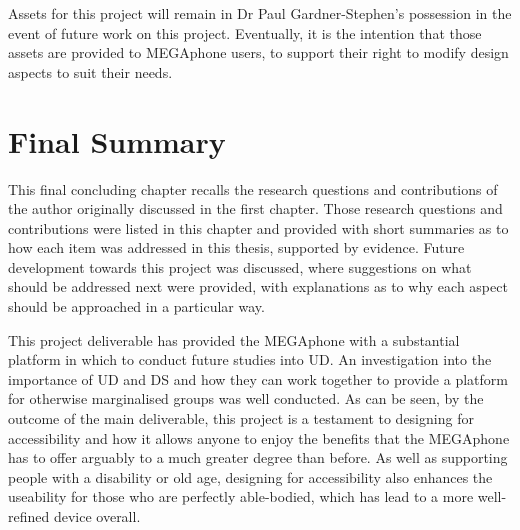Assets for this project will remain in Dr Paul Gardner-Stephen's possession in the event of future work on this project.
Eventually, it is the intention that those assets are provided to MEGAphone users, to support their right to modify design aspects to suit their needs.


\section{Final Summary}
This final concluding chapter recalls the research questions and contributions of the author originally discussed in the first chapter.
Those research questions and contributions were listed in this chapter and provided with short summaries as to how each item was addressed in this thesis, supported by evidence.
Future development towards this project was discussed, where suggestions on what should be addressed next were provided, with explanations as to why each aspect should be approached in a particular way.

This project deliverable has provided the MEGAphone with a substantial platform in which to conduct future studies into UD.
An investigation into the importance of UD and DS and how they can work together to provide a platform for otherwise marginalised groups was well conducted.
As can be seen, by the outcome of the main deliverable, this project is a testament to designing for accessibility and how it allows anyone to enjoy the benefits that the MEGAphone has to offer arguably to a much greater degree than before.
As well as supporting people with a disability or old age, designing for accessibility also enhances the useability for those who are perfectly able-bodied, which has lead to a more well-refined device overall.